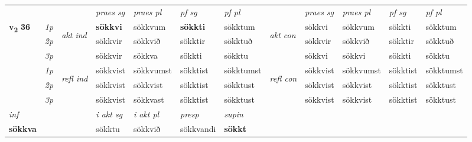\begin{longtable}[l]{X>{\footnotesize\itshape}llXXXXlXXXX}
 & &   & \textit{praes sg}  & \textit{praes pl}    & \textit{ pf sg} & \textit{pf pl} & & \textit{praes sg}  & \textit{praes pl}    & \textit{pf sg} & \textit{pf pl }  \\ \cmidrule{4-7} \cmidrule{9-12}
 \multirow{2}{*}{{{\textbf{v{\textsubscript{2}}} \Large{\textbf{36}}}}}  & 1p & \multirow{3}{*}{\begin{turn}{90}\textit{akt ind}\end{turn}} & \textbf{sökkvi} & sökkvum & \textbf{sökkti} & sökktum & \multirow{3}{*}{\begin{turn}{90}\textit{akt con}\end{turn}} &sökkvi & sökkvum & sökkti & sökktum\\*
 & 2p &  &  sökkvir  & sökkvið & sökktir & sökktuð & & sökkvir & sökkvið & sökktir & sökktuð \\*
 & 3p &  & sökkvir & sökkva & sökkti & sökktu & & sökkvi & sökkvi& sökkti & sökktu \\*
\cmidrule{4-7} \cmidrule{9-12}
 & 1p & \multirow{3}{*}{\begin{turn}{90}\textit{refl ind}\end{turn}}  & sökkvist & sökkvumst & sökktist & sökktumst & \multirow{3}{*}{\begin{turn}{90}\textit{refl con}\end{turn}}  &sökkvist & sökkvumst & sökktist & sökktumst \\*
 & 2p &  & sökkvist & sökkvist & sökktist & sökktust & &sökkvist & sökkvist & sökktist & sökktust \\*
 & 3p  & & sökkvist & sökkvast & sökktist & sökktust & & sökkvist & sökkvist& sökktist & sökktust \\*
\cmidrule{4-7} \cmidrule{9-12}

   {\textit{inf}} & &  & \textit{i akt sg} & \textit{i akt pl}   & \textit{presp} & \textit{supin}   \\*
  {\textbf{sökkva}} & && sökktu  & sökkvið   & sökkvandi &  \textbf{sökkt}   \\*

\midrule


\end{longtable}
